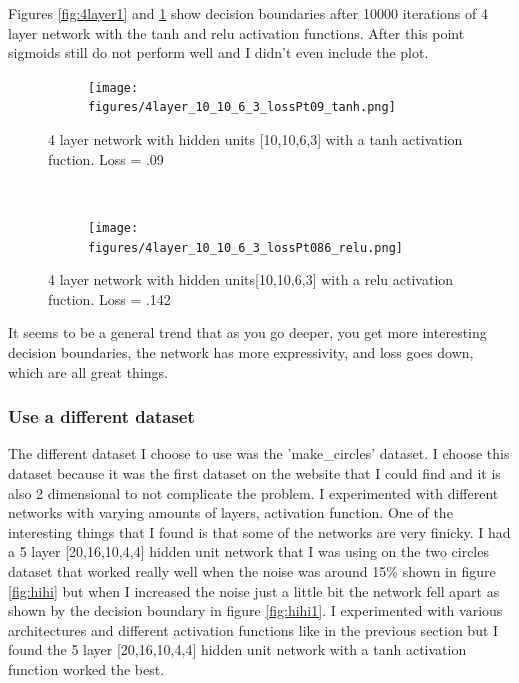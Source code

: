 \documentclass[]{article}
\begin{document}
Figures \ref{fig:4layer1} and \ref{fig:4layer3} show decision boundaries after 10000 iterations of 4 layer network with the tanh and relu activation functions. After this point sigmoids still do not perform well and I didn't even include the plot. 

\begin{figure}[ht]
    \centering
    \begin{subfigure}
        \centering
        \texttt{[image: figures/4layer\_10\_10\_6\_3\_lossPt09\_tanh.png]}
    \end{subfigure}%
    \caption{4 layer network with hidden units [10,10,6,3] with a tanh activation fuction. Loss = .09}
 \label{fig:4layer1}
    ~ 
    \begin{subfigure}
        \centering
        \texttt{[image: figures/4layer\_10\_10\_6\_3\_lossPt086\_relu.png]}
    \end{subfigure}
    \caption{4 layer network with hidden units[10,10,6,3] with a relu activation fuction. Loss = .142}
 \label{fig:4layer3}
\end{figure}

It seems to be a general trend that as you go deeper, you get more interesting decision boundaries, the network has more expressivity, and loss goes down, which are all great things. 

\subsubsection{Use a different dataset}
The different dataset I choose to use was the 'make\_circles' dataset. I choose this dataset because it was the first dataset on the website that I could find and it is also 2 dimensional to not complicate the problem. I experimented with different networks with varying amounts of layers, activation function. One of the interesting things that I found is that some of the networks are very finicky. I had a 5 layer [20,16,10,4,4] hidden unit network that I was using on the two circles dataset that worked really well when the noise was around 15\% shown in figure \ref{fig:hihi} but when I increased the noise just a little bit the network fell apart as shown by the decision boundary in figure \ref{fig:hihi1}. I experimented with various architectures and different activation functions like in the previous section but I found the 5 layer [20,16,10,4,4] hidden unit network with a tanh activation function worked the best. 
\end{document}
